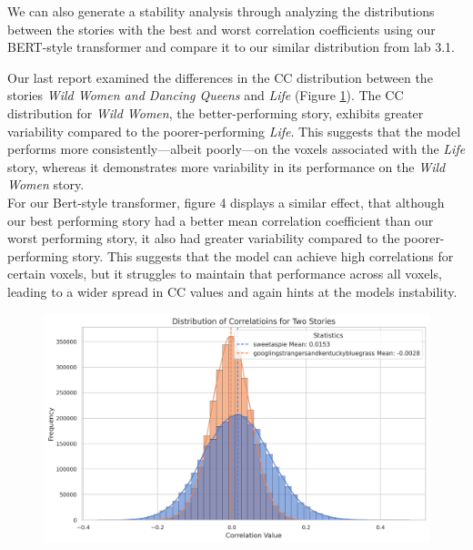 \documentclass{article}
\begin{document}
We can also generate a stability analysis through analyzing the distributions between the stories with the best and worst correlation coefficients using our BERT-style transformer and compare it to our similar distribution from lab 3.1. 

Our last report examined the differences in the CC distribution between the stories \textit{Wild Women and Dancing Queens} and \textit{Life} (Figure \ref{story}). The CC distribution for \textit{Wild Women}, the better-performing story, exhibits greater variability compared to the poorer-performing \textit{Life}. This suggests that the model performs more consistently—albeit poorly—on the voxels associated with the \textit{Life} story, whereas it demonstrates more variability in its performance on the \textit{Wild Women} story. \\

For our Bert-style transformer, figure 4 displays a similar effect, that although our best performing story had a better mean correlation coefficient than our worst performing story, it also had greater variability compared to the poorer-performing story. This suggests that the model can achieve high correlations for certain voxels, but it struggles to maintain that performance across all voxels, leading to a wider spread in CC values and again hints at the models instability. 

\begin{figure}[H]
\centering
\captionsetup{width=\textwidth}
\includegraphics[width=1\textwidth]{./figs/story_1.png}
\label{story}
\end{figure}
\end{document}
